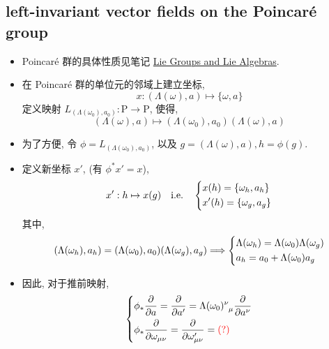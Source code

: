 \documentclass[10pt, a4paper]{article}
\numberwithin{equation}{section}
\begin{document}
	\subsection{left-invariant vector fields on the Poincaré group}
	\begin{itemize}
		\item Poincaré 群的具体性质见笔记 \href{https://github.com/siyang03/my-note---Lie-Groups-and-Lie-Algebras}{Lie Groups and Lie Algebras}.
		
		\item 在 Poincaré 群的单位元的邻域上建立坐标,
		\begin{equation}
			x : (\Lambda(\omega), a) \mapsto \{\omega, a\}
		\end{equation}
		定义映射 $L_{(\Lambda(\omega_0), a_0)} : \mathrm{P} \rightarrow \mathrm{P}$, 使得,
		\begin{equation}
			(\Lambda(\omega), a) \mapsto (\Lambda(\omega_0), a_0) (\Lambda(\omega), a)
		\end{equation}
		
		\item 为了方便, 令 $\phi = L_{(\Lambda(\omega_0), a_0)}$, 以及 $g = (\Lambda(\omega), a), h = \phi(g)$.
		
		\item 定义新坐标 $x'$, (有 $\phi^* x' = x$),
		\begin{equation}
			x' : h \mapsto x(g) \quad \text{i.e.} \quad \begin{dcases}
				x(h) = \{\omega_h, a_h\} \\
				x'(h) = \{\omega_g, a_g\}
			\end{dcases}
		\end{equation}
		其中,
		\begin{equation} \label{2.12}
			(\Lambda(\omega_h), a_h) = (\Lambda(\omega_0), a_0) (\Lambda(\omega_g), a_g) \Longrightarrow \begin{dcases}
				\Lambda(\omega_h) = \Lambda(\omega_0) \Lambda(\omega_g) \\
				a_h = a_0 + \Lambda(\omega_0) a_g
			\end{dcases}
		\end{equation}
		
		\item 因此, 对于推前映射,
		\begin{equation}
			\begin{dcases}
				\phi_* \frac{\partial}{\partial a} = \frac{\partial}{\partial a'} = \tensor{\Lambda(\omega_0)}{^\nu_\mu} \frac{\partial}{\partial a^\nu} \\
				\phi_* \frac{\partial}{\partial \omega_{\mu \nu}} = \frac{\partial}{\partial \omega'_{\mu \nu}} = \mathcolor{red}{(?)}
			\end{dcases}
		\end{equation}
		

\end{itemize}
\end{document}
